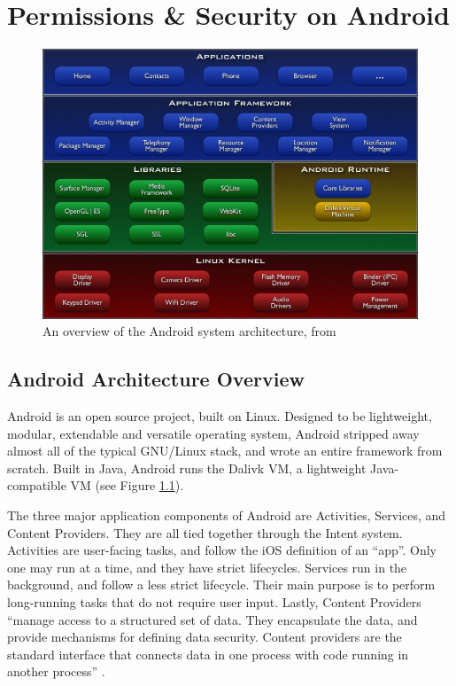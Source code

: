 \chapter{Permissions \& Security on Android}
\label{sec:permissions}

\begin{figure}[t]
\begin{center}
\includegraphics[width=0.7\columnwidth]{figs/system-architecture}
\caption{An overview of the Android system architecture, from \citep{androidarchitectureoverview}}
\label{fig:androidoverview}
\end{center}
\end{figure}


\section{Android Architecture Overview}
Android is an open source project, built on Linux. Designed to be lightweight, modular, extendable and versatile operating system, Android stripped away almost all of the typical GNU/Linux stack, and wrote an entire framework from scratch. Built in Java, Android runs the Dalivk VM, a lightweight Java-compatible VM (see Figure \ref{fig:androidoverview}). 

The three major application components of Android are Activities, Services, and Content Providers. They are all tied together through the Intent system. Activities are user-facing tasks, and follow the iOS definition of an ``app''. Only one may run at a time, and they have strict lifecycles. Services run in the background, and follow a less strict lifecycle. Their main purpose is to perform long-running tasks that do not require user input. Lastly, Content Providers ``manage access to a structured set of data. They encapsulate the data, and provide mechanisms for defining data security. Content providers are the standard interface that connects data in one process with code running in another process'' \citep{androidcontentproviders}.

